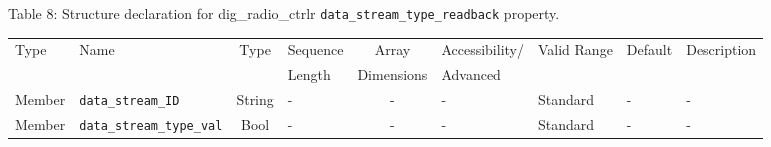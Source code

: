 \documentclass{article}
\def\comp{dig\_radio\_ctrlr}
\begin{document}
\begin{landscape}
	\noindent Table \hypertarget{tab8}{8}: Structure declaration for \comp{} \verb+data_stream_type_readback+ property.
	\begin{scriptsize}
		\noindent\begin{longtable}{|p{1.8cm}|p{3.6cm}|c|p{4cm}|c|p{2cm}|p{1.7cm}|p{0.8cm}|p{4.81cm}|}
			\hline
			\rowcolor{blue}
			Type         & Name                                & Type & Sequence & Array      & Accessibility/ & Valid Range  & Default & Description                                                                                                                                                                                                                       \\
			\rowcolor{blue}
			             &                                     &      & Length   & Dimensions & Advanced       &              &         &                                                                                                                                                                                                                             \\
			\hline
			Member       & \verb+data_stream_ID+               & String& -       & -          & -              & Standard     & -       & - \\
			\hline
			Member       & \verb+data_stream_type_val+         & Bool& -       & -          & -              & Standard & -       & - \\
			\hline
		\end{longtable}
	\end{scriptsize}




\end{landscape}
\end{document}
